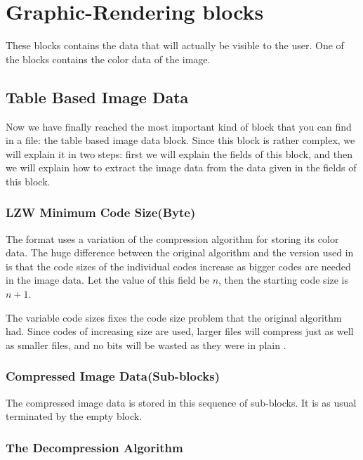 \section{Graphic-Rendering blocks}

These blocks contains the data that will actually be visible to the
user. One of the blocks contains the color data of the image.

\subsection{Table Based Image Data}

Now we have finally reached the most important kind of block that you
can find in a \gif file: the table based image data block. Since this
block is rather complex, we will explain it in two steps: first we will
explain the fields of this block, and then we will explain how to
extract the image data from the data given in the fields of this
block.

\subsubsection{LZW Minimum Code Size(Byte)}

The \gif format uses a variation of the \lzw compression algorithm
for storing its color data. The huge difference between the
original \lzw algorithm and the version used in \gif is that the
code sizes of the individual codes increase as bigger codes are
needed in the image data.  Let the value of this field be $n$, then
the starting \lzw code size is $n + 1$.

The variable code sizes fixes the code size problem that the original
\lzw algorithm had. Since codes of increasing size are used, larger
files will compress just as well as smaller files, and no bits will be
wasted as they were in plain \lzw.

\subsubsection{Compressed Image Data(Sub-blocks)}

The compressed image data is stored in this sequence of sub-blocks. It
is as usual terminated by the empty block.

\subsubsection{The Decompression Algorithm}

